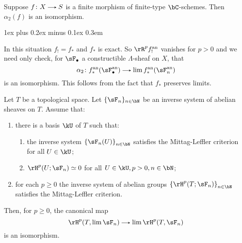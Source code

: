 \documentclass[11pt,leqno]{article}
\makeatletter
\newcommand{\thmheadfont}{\scshape}
\newcommand{\thmhorizspace}{0.3em}
\newcommand{\thmsep}{\hspace{\thmhorizspace}---}
\renewenvironment{proof}[1][Proof]{\par
  \pushQED{\qed}%
  \normalfont%
  \topsep1ex plus 0.2ex minus 0.1ex\relax%
  \labelsep \thmhorizspace\relax%
  \trivlist
  \item[\hskip\labelsep\thmheadfont#1\@addpunct{\thmsep}]\ignorespaces
}{%
  \popQED\endtrivlist\@endpefalse%
}
\theoremstyle{block}
\numberwithin{subblock}{block}
\numberwithin{equation}{subblock}
\newcommand{\arrlen}{1.25em}
\renewcommand{\to}{\mathrel{\tikz[baseline]%
    \draw[>=stealth,->](0,0.5ex)--(\arrlen,0.5ex);}}
\renewcommand{\l}{\left}
\renewcommand{\r}{\right}
\renewcommand{\c}{\colon}
\newcommand{\iso}{\simeq}
\numberwithin{block}{section}
\makeatother
\begin{document}
\begin{nothing}
  \begin{sublemma}
    \label{comp-a2-finite}
    Suppose $f \c X \to S$ is a finite morphism of finite-type $\bC$-schemes. Then $\alpha_2(f)$ is an isomorphism.

    \begin{proof}
      In this situation $f_! = f_*$ and $f_*$ is exact. So $\rR^p f^\an_!$ vanishes for $p > 0$ and we need only check, for $\sF_\bullet$ a constructible $\Lambda$-sheaf on $X$, that
      \[
        \alpha_2 \c f^\an_*(\sF_\bullet^\an) \to \lim f^\an_*(\sF_n^\an)
      \]
      is an isomorphism. This follows from the fact that $f_*$ preserves limits.
    \end{proof}
  \end{sublemma}
  
  \begin{sublemma}
    \label{comp-a2-lim}
    Let $T$ be a topological space. Let $\{\sF_n\}_{n \in \bN}$ be an inverse system of abelian sheaves on $T$. Assume that:
    \begin{enumerate}
    \item \label{comp-a2-lim-basis}
      there is a basis $\kU$ of $T$ such that:
      \begin{enumerate}
      \item the inverse system $\l\{\sF_n(U)\r\}_{n \in \bN}$ satisfies the Mittag-Leffler criterion for all $U \in \kU$;
      \item $\rH^p(U;\sF_n) \iso 0$ for all $U \in \kU, p > 0, n \in \bN$;
      \end{enumerate}
    \item \label{comp-a2-lim-ML}
      for each $p \ge 0$ the inverse system of abelian groups $\l\{\rH^p(T;\sF_n)\r\}_{n \in \bN}$ satisfies the Mittag-Leffler criterion.
    \end{enumerate}
    Then, for $p \ge 0$, the canonical map
    \[
      \rH^p(T,\lim \sF_n) \to \lim {\rH^p(T,\sF_n)}
    \]
    is an isomorphism.


\end{sublemma}
\end{nothing}
\end{document}
